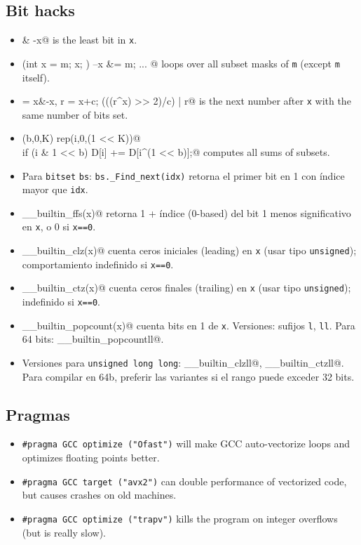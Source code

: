     \subsection{Bit hacks}
        \begin{itemize}
            \item \verb@x & -x@ is the least bit in \texttt{x}.
            \item \verb@for (int x = m; x; ) { --x &= m; ... }@ loops over all subset masks of \texttt{m} (except \texttt{m} itself).
            \item \verb@c = x&-x, r = x+c; (((r^x) >> 2)/c) | r@ is the next number after \texttt{x} with the same number of bits set.
            \item \verb@rep(b,0,K) rep(i,0,(1 << K))@ \\ \verb@  if (i & 1 << b) D[i] += D[i^(1 << b)];@ computes all sums of subsets.
            \item Para \texttt{bitset} \verb|bs|: \verb|bs._Find_next(idx)| retorna el primer bit en 1 con índice mayor que \texttt{idx}.
            \item \verb@__builtin_ffs(x)@ retorna 1 + índice (0-based) del bit 1 menos significativo en \texttt{x}, o 0 si \texttt{x==0}.
            \item \verb@__builtin_clz(x)@ cuenta ceros iniciales (leading) en \texttt{x} (usar tipo \texttt{unsigned}); comportamiento indefinido si \texttt{x==0}.
            \item \verb@__builtin_ctz(x)@ cuenta ceros finales (trailing) en \texttt{x} (usar tipo \texttt{unsigned}); indefinido si \texttt{x==0}.
            \item \verb@__builtin_popcount(x)@ cuenta bits en 1 de \texttt{x}. Versiones: sufijos \texttt{l}, \texttt{ll}. Para 64 bits: \verb@__builtin_popcountll@.
            \item Versiones para \texttt{unsigned long long}: \verb@__builtin_clzll@, \verb@__builtin_ctzll@. Para compilar en 64b, preferir las variantes \verb@ll@ si el rango puede exceder 32 bits.
        \end{itemize}
    \subsection{Pragmas}
        \begin{itemize}
            \item \lstinline{#pragma GCC optimize ("Ofast")} will make GCC auto-vectorize loops and optimizes floating points better.
            \item \lstinline{#pragma GCC target ("avx2")} can double performance of vectorized code, but causes crashes on old machines.
            \item \lstinline{#pragma GCC optimize ("trapv")} kills the program on integer overflows (but is really slow).
        \end{itemize}
